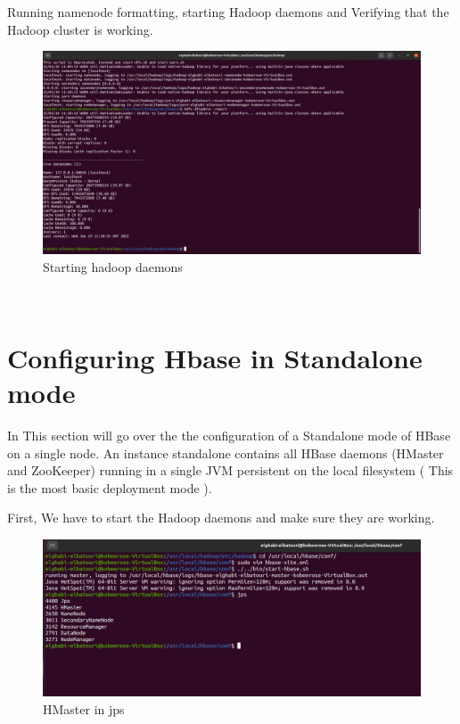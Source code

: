 \begin{spacing}{1.2}
\par Running namenode formatting, starting Hadoop daemons and Verifying that the Hadoop cluster is working.
\\
\begin{figure}[!htb] 
\begin{center} 
\includegraphics[width=1\linewidth]{Pictures/HBase/Configuring Hbase in Standalone & Pseudo-distributed mode/Installing and Configuring Apache Hbase/Starting hadoop daemons} 
\end{center} 
\caption{Starting hadoop daemons} 
\end{figure}  \FloatBarrier
\\
\newpage
\section{Configuring Hbase in Standalone mode }

\par In This section will go over the the configuration of a Standalone mode of HBase on a single node. An instance standalone contains all HBase daemons (HMaster and ZooKeeper) running in a single JVM persistent on the local filesystem ( This is the most basic deployment mode ).
\\

\par First, We have to start the Hadoop daemons and make sure they are working.
\begin{figure}[!htb] 
\begin{center} 
\includegraphics[width=1\linewidth]{Pictures/HBase/Configuring Hbase in Standalone & Pseudo-distributed mode/Configuring Hbase in Standalone mode/HMaster in jps} 
\end{center} 
\caption{HMaster in jps} 
\end{figure}  \FloatBarrier
\\


\end{spacing}
